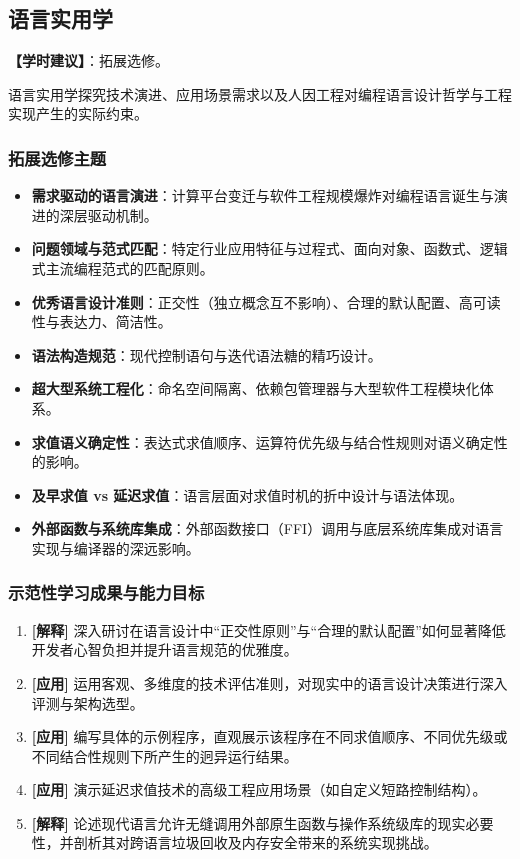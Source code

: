 \subsection{语言实用学}
\textbf{【学时建议】}：拓展选修。

语言实用学探究技术演进、应用场景需求以及人因工程对编程语言设计哲学与工程实现产生的实际约束。

\subsubsection{拓展选修主题}
\begin{itemize}
    \item \textbf{需求驱动的语言演进}：计算平台变迁与软件工程规模爆炸对编程语言诞生与演进的深层驱动机制。
    \item \textbf{问题领域与范式匹配}：特定行业应用特征与过程式、面向对象、函数式、逻辑式主流编程范式的匹配原则。
    \item \textbf{优秀语言设计准则}：正交性（独立概念互不影响）、合理的默认配置、高可读性与表达力、简洁性。
    \item \textbf{语法构造规范}：现代控制语句与迭代语法糖的精巧设计。
    \item \textbf{超大型系统工程化}：命名空间隔离、依赖包管理器与大型软件工程模块化体系。
    \item \textbf{求值语义确定性}：表达式求值顺序、运算符优先级与结合性规则对语义确定性的影响。
    \item \textbf{及早求值 vs 延迟求值}：语言层面对求值时机的折中设计与语法体现。
    \item \textbf{外部函数与系统库集成}：外部函数接口（FFI）调用与底层系统库集成对语言实现与编译器的深远影响。
\end{itemize}

\subsubsection{示范性学习成果与能力目标}
\begin{enumerate}
    \item \textbf{[解释]} 深入研讨在语言设计中“正交性原则”与“合理的默认配置”如何显著降低开发者心智负担并提升语言规范的优雅度。
    \item \textbf{[应用]} 运用客观、多维度的技术评估准则，对现实中的语言设计决策进行深入评测与架构选型。
    \item \textbf{[应用]} 编写具体的示例程序，直观展示该程序在不同求值顺序、不同优先级或不同结合性规则下所产生的迥异运行结果。
    \item \textbf{[应用]} 演示延迟求值技术的高级工程应用场景（如自定义短路控制结构）。
    \item \textbf{[解释]} 论述现代语言允许无缝调用外部原生函数与操作系统级库的现实必要性，并剖析其对跨语言垃圾回收及内存安全带来的系统实现挑战。
\end{enumerate}

